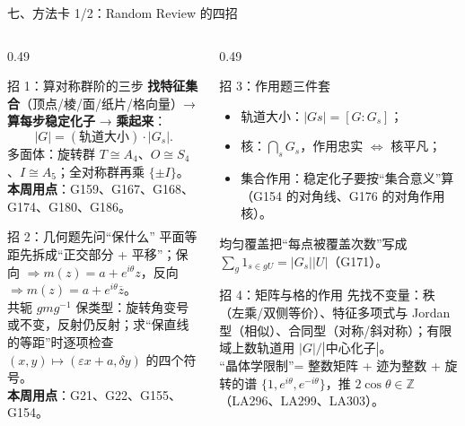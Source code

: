 \documentclass[aspectratio=169,10pt,fontset=none]{ctexbeamer}
\newcommand{\key}[1]{\textcolor{ink}{\bfseries #1}}
\begin{document}
\begin{frame}[t]{七、方法卡 1/2：Random Review 的四招}
  \label{sec:methods1}
  \begin{columns}[T,onlytextwidth]
    \begin{column}{0.49\textwidth}
      \begin{block}{\footnotesize 招 1：算对称群阶的三步}
        \scriptsize
        \textbf{找特征集合}（顶点/棱/面/纸片/格向量）→ \textbf{算每步稳定化子} → \textbf{乘起来}：
        \[ |G|=(\text{轨道大小})\cdot|G_s|. \]
        多面体：旋转群 $T\cong A_4$、$O\cong S_4$、$I\cong A_5$；全对称群再乘 $\{\pm I\}$。\\
        \key{本周用点}：G159、G167、G168、G174、G180、G186。
      \end{block}
      \begin{block}{\footnotesize 招 2：几何题先问“保什么”}
        \scriptsize
        平面等距先拆成“正交部分 + 平移”；保向 $\Rightarrow m(z)=a+e^{i\theta}z$，反向 $\Rightarrow m(z)=a+e^{i\theta}\overline z$。\\
        共轭 $gmg^{-1}$ 保类型：旋转角变号或不变，反射仍反射；求“保直线的等距”时逐项检查 $(x,y)\mapsto(\varepsilon x+a,\delta y)$ 的四个符号。\\
        \key{本周用点}：G21、G22、G155、G154。
      \end{block}
    \end{column}
    \begin{column}{0.49\textwidth}
      \begin{block}{\footnotesize 招 3：作用题三件套}
        \scriptsize
        \begin{itemize}\setlength{\itemsep}{1pt}
          \item 轨道大小：$|Gs|=[G:G_s]$；
          \item 核：$\bigcap_s G_s$，作用忠实 $\iff$ 核平凡；
          \item 集合作用：稳定化子要按“集合意义”算（G154 的对角线、G176 的对角作用核）。
        \end{itemize}
        均匀覆盖把“每点被覆盖次数”写成 $\sum_{g}1_{s\in gU}=|G_s||U|$（G171）。
      \end{block}
      \begin{block}{\footnotesize 招 4：矩阵与格的作用}
        \scriptsize
        先找不变量：秩（左乘/双侧等价）、特征多项式与 Jordan 型（相似）、合同型（对称/斜对称）；有限域上数轨道用 $|G|/|\text{中心化子}|$。\\
        “晶体学限制”= 整数矩阵 + 迹为整数 + 旋转的谱 $\{1,e^{i\theta},e^{-i\theta}\}$，推 $2\cos\theta\in\mathbb Z$（LA296、LA299、LA303）。
      \end{block}
    \end{column}
  \end{columns}
\end{frame}
\end{document}
